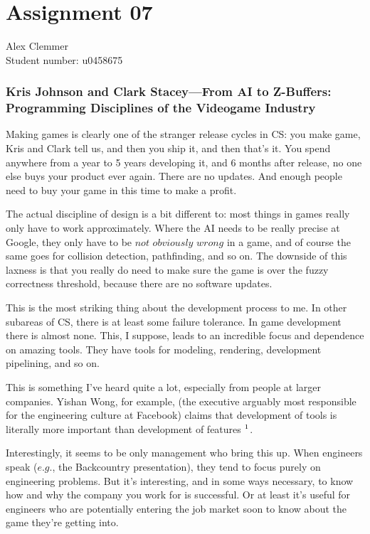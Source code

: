 \documentclass[a4paper]{article}
\begin{document}
\section*{Assignment 07}
Alex Clemmer\\
Student number: u0458675

\subsubsection*{Kris Johnson and Clark Stacey---From AI to Z-Buffers: Programming Disciplines of the Videogame Industry}

Making games is clearly one of the stranger release cycles in CS: you make game, Kris and Clark tell us, and then you ship it, and then that's it. You spend anywhere from a year to 5 years developing it, and 6 months after release, no one else buys your product ever again. There are no updates. And enough people need to buy your game in this time to make a profit.

The actual discipline of design is a bit different to: most things in games really only have to work approximately. Where the AI needs to be really precise at Google, they only have to be $\textit{not obviously wrong}$ in a game, and of course the same goes for collision detection, pathfinding, and so on. The downside of this laxness is that you really do need to make sure the game is over the fuzzy correctness threshold, because there are no software updates. 

This is the most striking thing about the development process to me. In other subareas of CS, there is at least some failure tolerance. In game development there is almost none. This, I suppose, leads to an incredible focus and dependence on amazing tools. They have tools for modeling, rendering, development pipelining, and so on.

This is something I've heard quite a lot, especially from people at larger companies. Yishan Wong, for example, (the executive arguably most responsible for the engineering culture at Facebook) claims that development of tools is literally more important than development of features $\footnotemark$.

Interestingly, it seems to be only management who bring this up. When engineers speak ($\textit{e.g.}$, the Backcountry presentation), they tend to focus purely on engineering problems. But it's interesting, and in some ways necessary, to know how and why the company you work for is successful. Or at least it's useful for engineers who are potentially entering the job market soon to know about the game they're getting into.
\end{document}
